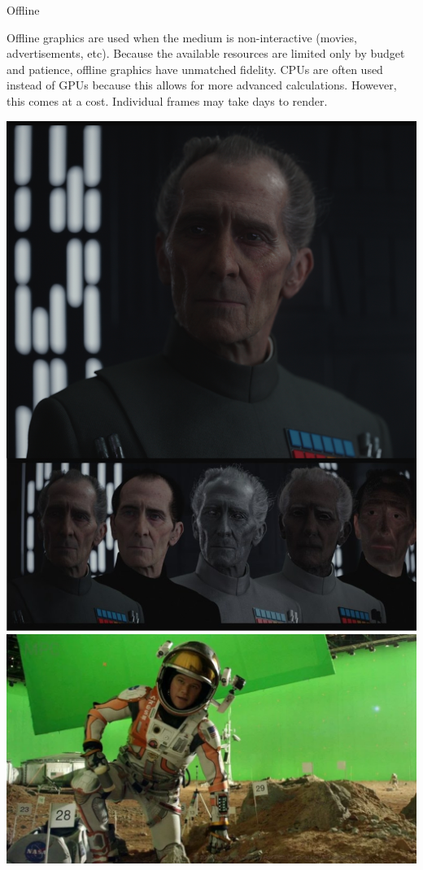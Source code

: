 \documentclass{lug}
\begin{document}
\begin{frame}{Offline}
    \noindent
    \begin{minipage}{.7\textwidth - 1.5em}
        \small

        Offline graphics are used when the medium is non-interactive (movies,
        advertisements, etc). Because the available resources are limited only
        by budget and patience, offline graphics have unmatched fidelity. CPUs
        are often used instead of GPUs because this allows for more advanced
        calculations. However, this comes at a cost. Individual frames may
        take days to render.

    \end{minipage}%
    \hspace{1.5em}%
    \begin{minipage}{.3\textwidth}
        \includegraphics[width=\textwidth]{graphics/tarkin_combo} \\
        \includegraphics[width=\textwidth]{graphics/green_mars}
    \end{minipage}
\end{frame}
\end{document}
